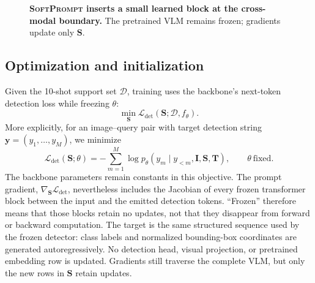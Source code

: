 \documentclass{article}
\newcommand{\ours}{\textsc{SoftPrompt}}
\begin{document}
\begin{figure}[t]
  \centering
  \caption{\textbf{\ours{} inserts a small learned block at the cross-modal
  boundary.} The pretrained VLM remains frozen; gradients update only
  $\mathbf S$.}
  \label{fig:overview}
\end{figure}

\subsection{Optimization and initialization}
\label{subsec:method_training}
\label{subsec:method_init}

Given the 10-shot support set $\mathcal D$, training uses the backbone's
next-token detection loss while freezing $\theta$:
\begin{equation}
  \min_{\mathbf S}\mathcal L_{\mathrm{det}}(\mathbf S;\mathcal D,f_\theta).
  \label{eq:loss}
\end{equation}
More explicitly, for an image--query pair with target detection string
$\mathbf y=(y_1,\ldots,y_M)$, we minimize
\begin{equation}
  \mathcal L_{\mathrm{det}}(\mathbf S;\theta)
  =-\sum_{m=1}^{M}\log p_\theta
    (y_m\mid y_{<m},\mathbf I,\mathbf S,\mathbf T),
  \qquad \theta\ \text{fixed}.
  \label{eq:autoregressive_loss}
\end{equation}
The backbone parameters remain constants in this objective. The prompt
gradient,
$\nabla_{\mathbf S}\mathcal L_{\mathrm{det}}$, nevertheless includes the
Jacobian of every frozen transformer block between the input and the emitted
detection tokens. ``Frozen'' therefore means that those blocks retain no
updates, not that they disappear from forward or backward computation.
The target is the same structured sequence used by the frozen detector:
class labels and normalized bounding-box coordinates are generated
autoregressively. No detection head, visual projection, or pretrained
embedding row is updated. Gradients still traverse the complete VLM, but only
the new rows in $\mathbf S$ retain updates.
\end{document}
